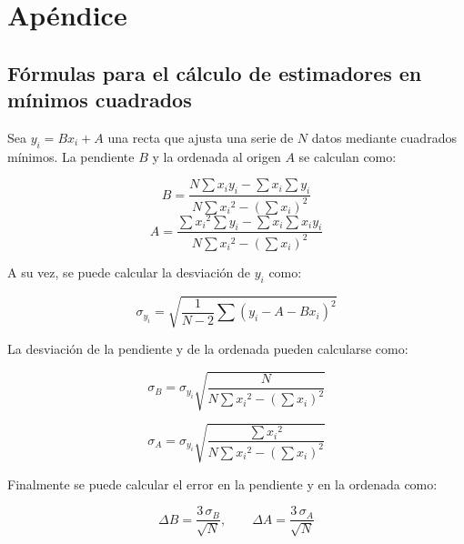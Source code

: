 \section{Apéndice}
\label{sec:apendice}

\subsection{Fórmulas para el cálculo de estimadores en mínimos cuadrados}
\label{sec:apendice:formulas-estimadores-mc}

Sea $y_i = Bx_i + A$ una recta que ajusta una serie de $N$ datos mediante
cuadrados mínimos. La pendiente $B$ y la ordenada al origen $A$ se calculan
como:

\newcommand{\denominador}{N \sum {x_i}^2 - \left( \sum x_i \right)^2} 

\begin{equation}
    \label{ec:apendice:pendiente-mc}
    B = \frac{ N \sum x_i y_i - \sum x_i \sum y_i }
             { \denominador }
\end{equation}
\vspace{5mm}
\begin{equation}
    \label{ec:apendice:ordenada-mc}
    A = \frac{ \sum {x_i}^2 \sum y_i - \sum x_i \sum x_i y_i}
             { \denominador }
\end{equation}
\vspace{5mm}

A su vez, se puede calcular la desviación de $y_i$ como:

\begin{equation}
    \label{ec:apendice:desviacion-y-mc}
    \sigma_{y_i} = \sqrt{ \frac{1}{N-2} \sum 
                          \left( y_i - A - B x_i \right)^2 }
\end{equation}

\vspace{5mm}
La desviación de la pendiente y de la ordenada pueden calcularse como:

\begin{equation}
    \label{ec:apendice:desviacion-pendiente-mc}
    \sigma_B = \sigma_{y_i} \sqrt { \frac{N}{\denominador} }
\end{equation}

\vspace{5mm}
\begin{equation}
    \label{ec:apendice:desviacion-ordenada-mc}
    \sigma_A = \sigma_{y_i} \sqrt { \frac{ \sum {x_i}^2 }{ \denominador } }
\end{equation}

\vspace{5mm}
Finalmente se puede calcular el error en la pendiente y en la ordenada como:

\begin{equation}
    \label{ec:apendice:errores-mc}
    \Delta B = \frac{3\,\sigma_B}{\sqrt{N}}, \quad\quad
    \Delta A = \frac{3\,\sigma_A}{\sqrt{N}}
\end{equation}
